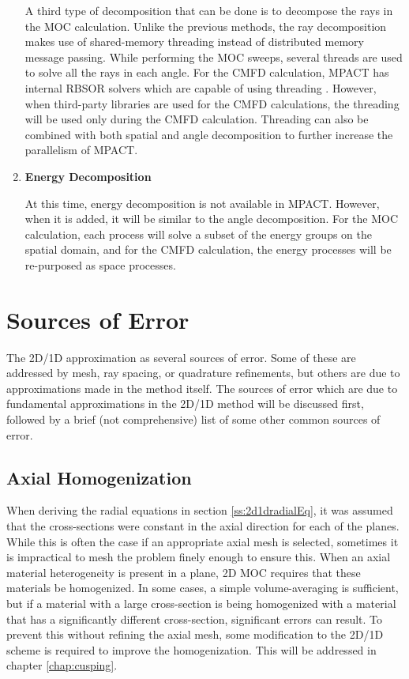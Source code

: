 \begin{enumerate}[leftmargin=*]
A third type of decomposition that can be done is to decompose the rays in the MOC calculation.  Unlike the previous methods, the ray decomposition makes use of shared-memory threading instead of distributed memory message passing.  While performing the MOC sweeps, several threads are used to solve all the rays in each angle.  For the CMFD calculation, MPACT has internal RBSOR solvers which are capable of using threading .  However, when third-party libraries are used for the CMFD calculations, the threading will be used only during the CMFD calculation.  Threading can also be combined with both spatial and angle decomposition to further increase the parallelism of MPACT.

\item \textbf{Energy Decomposition}

At this time, energy decomposition is not available in MPACT.  However, when it is added, it will be similar to the angle decomposition.  For the MOC calculation, each process will solve a subset of the energy groups on the spatial domain, and for the CMFD calculation, the energy processes will be re-purposed as space processes.
\end{enumerate}

\section{Sources of Error}

The 2D/1D approximation as several sources of error.  Some of these are addressed by mesh, ray spacing, or quadrature refinements, but others are due to approximations made in the method itself.  The sources of error which are due to fundamental approximations in the 2D/1D method will be discussed first, followed by a brief (not comprehensive) list of some other common sources of error.

\subsection{Axial Homogenization}

When deriving the radial equations in section \ref{ss:2d1dradialEq}, it was assumed that the cross-sections were constant in the axial direction for each of the planes.  While this is often the case if an appropriate axial mesh is selected, sometimes it is impractical to mesh the problem finely enough to ensure this.  When an axial material heterogeneity is present in a plane, 2D MOC requires that these materials be homogenized.  In some cases, a simple volume-averaging is sufficient, but if a material with a large cross-section is being homogenized with a material that has a significantly different cross-section, significant errors can result.  To prevent this without refining the axial mesh, some modification to the 2D/1D scheme is required to improve the homogenization.  This will be addressed in chapter \ref{chap:cusping}.

